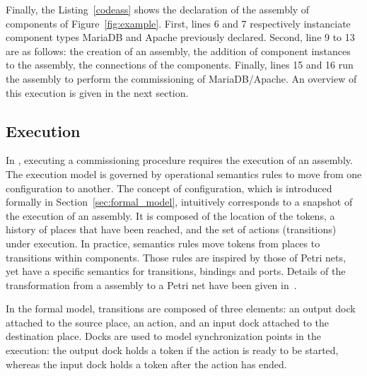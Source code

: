 

Finally, the Listing~\ref{codeass} shows the declaration of the
assembly of components of Figure~\ref{fig:example}. First, lines 6 and
7 respectively instanciate component types MariaDB and Apache
previously declared. Second, line 9 to 13 are as follows: the creation
of an assembly, the addition of component instances to the assembly,
the connections of the components. Finally, lines 15 and 16 run the
assembly to perform the commissioning of MariaDB/Apache. An overview
of this execution is given in the next section.




\subsection{Execution}

In \mad, executing a commissioning procedure requires the execution of
an assembly. The \mad execution model is governed by operational
semantics rules to move from one configuration to another. The concept
of configuration, which is introduced formally in
Section~\ref{sec:formal_model}, intuitively corresponds to a snapshot
of the execution of an assembly. It is composed of the location of the
tokens, a history of places that have been reached, and the set of
actions (transitions) under execution. In practice, semantics rules
move tokens from places to transitions within components. Those rules
are inspired by those of Petri nets, yet have a specific semantics for
transitions, bindings and ports. Details of the transformation from a
\mad assembly to a Petri net have been given
in~\cite{coullon:hal-02323641}.

%
In the formal model, transitions are composed of three elements: an
output dock attached to the source place, an action, and an input dock
attached to the destination place. Docks are used to model
synchronization points in the execution: the output dock holds a token
if the action is ready to be started, whereas the input dock holds a
token after the action has ended.

